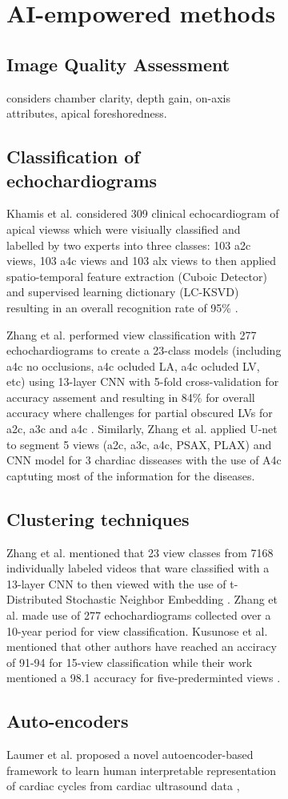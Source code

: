 \begin{figure}[H]
\begin{figure}[H]
\section{AI-empowered methods}

\subsection{Image Quality Assessment}
\cite{labs2021_in_miua} considers chamber clarity, depth gain, on-axis attributes, apical foreshoredness.

\subsection{Classification of echochardiograms}
Khamis et al. considered 309 clinical echocardiogram of apical viewss which were visiually classified and labelled by two experts into three classes: 103 a2c views, 103 a4c views and 103 alx views to then applied spatio-temporal feature extraction (Cuboic Detector) and supervised learning dictionary (LC-KSVD) resulting in an overall recognition rate of 95\% \cite{khamis2017}.

Zhang et al. performed view classification with 277 echochardiograms to create a 23-class models (including a4c no occlusions, a4c ocluded LA, a4c ocluded LV, etc) using 13-layer CNN with 5-fold cross-validation for accuracy assement and resulting in 84\% for overall accuracy where challenges for partial obscured LVs for a2c, a3c and a4c \cite{zhang2018}.
Similarly, Zhang et al. applied U-net to segment 5 views (a2c, a3c, a4c, PSAX, PLAX) and CNN model for 3 chardiac disseases with the use of A4c captuting most of the information for the diseases.



\subsection{Clustering techniques}
Zhang et al. mentioned that 23 view classes from 7168 individually labeled videos that ware classified with a 13-layer CNN to then viewed with the use of t-Distributed Stochastic Neighbor Embedding \cite{zhang2018}.
Zhang et al. made use of 277 echochardiograms collected over a 10-year period for view classification.
Kusunose et al. mentioned that other authors have reached an acciracy of 91-94 for 15-view classification while their work mentioned a 98.1 accuracy for five-prederminted views \cite{kusunose2021}.

\subsection{Auto-encoders}
Laumer et al. proposed a novel autoencoder-based framework to learn human interpretable representation of cardiac cycles from cardiac ultrasound data \cite{laumer2020},


\end{figure}
\end{figure}

